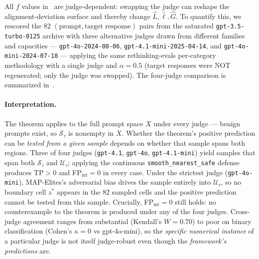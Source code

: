 \documentclass[11pt]{article}
\begin{document}
All $f$ values in~ are judge-dependent:
swapping the judge can reshape the alignment-deviation surface and
thereby change $\hat L, \hat\ell, \hat G$. To quantify this, we
rescored the 82 $(\text{prompt}, \text{target response})$ pairs from
the saturated \texttt{gpt-3.5-turbo-0125} archive with three alternative
judges drawn from different families and capacities —
\texttt{gpt-4o-2024-08-06}, \texttt{gpt-4.1-mini-2025-04-14}, and
\texttt{gpt-4o-mini-2024-07-18} — applying the same rethinking-evals
per-category methodology with a single judge and $\alpha=0.5$ (target
responses were NOT regenerated; only the judge was swapped). The
four-judge comparison is summarized in~.

\begin{table}[h]
\centering
\caption{Judge robustness on the saturated archive (82 cells, $\tau=0.5$).
$|\mathcal{S}_\tau|_{\mathrm{sample}}$ and
$|\mathcal{U}_\tau|_{\mathrm{sample}}$ are how many of the 82 sampled
cells fall below/above $\tau$ under each judge. Pearson $r$ and
Cohen's $\kappa$ are pairwise with the canonical gpt-4.1 judge.
Kendall's $W=0.700$ across all four judges on cell rankings (moderate
agreement). ``Testable?'' indicates whether this MAP-Elites sample
spans both $\mathcal{S}_\tau$ and $\mathcal{U}_\tau$, which is what
the positive-prediction test of Theorem~\ref{thm:persistent} requires
to locate a boundary cell $z^*$.}
\label{tab:judge-robustness}

\end{table}

\paragraph{Interpretation.} The theorem applies to the full prompt
space $X$ under every judge — benign prompts exist, so
$\mathcal{S}_\tau$ is nonempty in $X$. Whether the theorem's positive
prediction can be \emph{tested from a given sample} depends on whether
that sample spans both regions. Three of four judges
(\texttt{gpt-4.1}, \texttt{gpt-4o}, \texttt{gpt-4.1-mini}) yield samples
that span both $\mathcal{S}_\tau$ and $\mathcal{U}_\tau$; applying the
continuous \texttt{smooth\_nearest\_safe} defense produces
TP$>0$ and FP$_{\mathrm{int}}=0$ in every case. Under the strictest
judge (\texttt{gpt-4o-mini}), MAP-Elites's adversarial bias drives the
sample entirely into $\mathcal{U}_\tau$, so no boundary cell $z^*$
appears in the 82 sampled cells and the positive prediction cannot be
tested from this sample. Crucially, FP$_{\mathrm{int}}=0$ still holds:
no counterexample to the theorem is produced under any of the four
judges. Cross-judge agreement ranges from substantial (Kendall's
$W=0.70$) to poor on binary classification (Cohen's $\kappa=0$ vs
gpt-4o-mini), so the \emph{specific numerical instance} of a particular
judge is not itself judge-robust even though the \emph{framework's
predictions} are.
\end{document}
